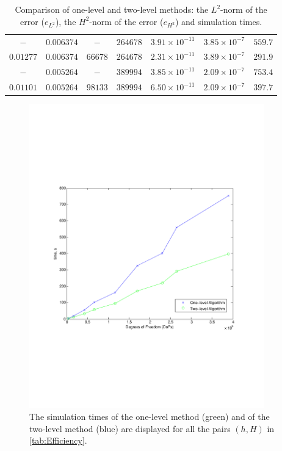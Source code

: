 \begin{table}
\begin{center}
{\begin{tabular}{|c|c|c|c|c|c|c|}
      $-$         & $0.006374$  & $-$       & $264678$  & $3.91\times 10^{-11}$
      & $3.85\times 10^{-7}$ & $559.7$ \\
      $0.01277$   & $0.006374$  & $66678$   & $264678$  & $2.31\times 10^{-11}$
        & $3.89\times 10^{-7}$ & $291.9$\\
      $-$         & $0.005264$  & $-$       & $389994$  & $3.85\times 10^{-11}$
        & $2.09\times 10^{-7}$ & $753.4$ \\
      $0.01101$   & $0.005264$  & $98133$   & $389994$  & $6.50\times 10^{-11}$
        & $2.09\times 10^{-7}$ & $397.7$ \\
      \hline
    \end{tabular}}
  \end{center}
  \caption{Comparison of one-level and two-level methods: the $L^2$-norm of the
    error ($e_{L^2}$), the $H^2$-norm of the error ($e_{H^2}$) and simulation
    times.}
  \label{tab:Efficiency}
\end{table}

\begin{center}
  \begin{figure}
    \begin{center}
    \includegraphics[width=4in,natwidth=610,natheight=642]{performanceplot.pdf}
    \caption{The simulation times of the one-level method (green) and of the
      two-level method (blue) are displayed for all the pairs $(h,H)$ in
      \autoref{tab:Efficiency}.}
    \label{fig:Efficiency}
    \end{center}
  \end{figure}
\end{center}

